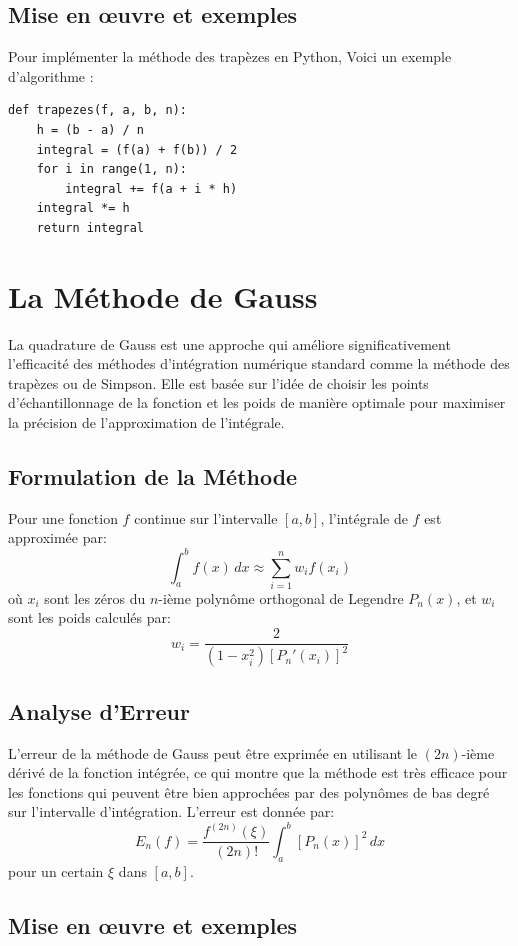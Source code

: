 \documentclass[12pt,a4paper]{article}
\begin{document}
\subsection{Mise en œuvre et exemples}

Pour implémenter la méthode des trapèzes en Python, Voici un exemple d'algorithme :
\begin{lstlisting}
def trapezes(f, a, b, n):
    h = (b - a) / n
    integral = (f(a) + f(b)) / 2
    for i in range(1, n):
        integral += f(a + i * h)
    integral *= h
    return integral
\end{lstlisting}
\newpage

\section{La Méthode de Gauss}
La quadrature de Gauss est une approche qui améliore significativement l'efficacité des méthodes d'intégration numérique standard comme la méthode des trapèzes ou de Simpson. Elle est basée sur l'idée de choisir les points d'échantillonnage de la fonction et les poids de manière optimale pour maximiser la précision de l'approximation de l'intégrale.

\subsection{Formulation de la Méthode}
Pour une fonction $f$ continue sur l'intervalle $[a,b]$, l'intégrale de $f$ est approximée par:
\[
\int_{a}^b f(x) \, dx \approx \sum_{i=1}^n w_i f(x_i)
\]
où $x_i$ sont les zéros du $n$-ième polynôme orthogonal de Legendre $P_n(x)$, et $w_i$ sont les poids calculés par:
\[
w_i = \frac{2}{(1-x_i^2)[P_n'(x_i)]^2}
\]

\subsection{Analyse d'Erreur}
L'erreur de la méthode de Gauss peut être exprimée en utilisant le $(2n)$-ième dérivé de la fonction intégrée, ce qui montre que la méthode est très efficace pour les fonctions qui peuvent être bien approchées par des polynômes de bas degré sur l'intervalle d'intégration. L'erreur est donnée par:
\[
E_n(f) = \frac{f^{(2n)}(\xi)}{(2n)!} \int_{a}^b [P_n(x)]^2 \, dx
\]
pour un certain $\xi$ dans $[a,b]$.
\\
\subsection{Mise en œuvre et exemples}
\end{document}

